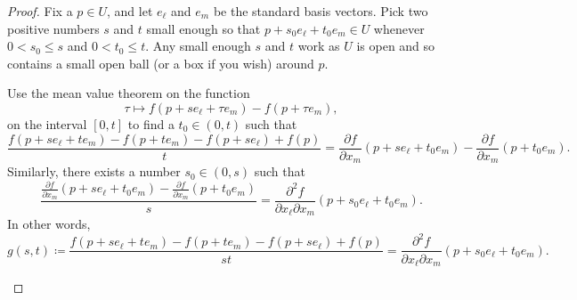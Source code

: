 \begin{proof}
Fix a $p \in U$, and let $e_{\ell}$ and $e_m$ be the standard basis vectors.
Pick two positive numbers $s$ and $t$ small enough so that
$p+s_0e_{\ell} +t_0e_m \in U$ whenever
$0 < s_0 \leq s$ and $0 < t_0 \leq t$.
Any small enough $s$ and $t$ work as $U$ is open and so
contains a small open ball (or a box if you wish) around $p$.

Use the mean value theorem on the function
\begin{equation*}
\tau \mapsto f(p+se_{\ell} + \tau e_m)-f(p + \tau e_m) ,
\end{equation*}
on the interval $[0,t]$
to find a $t_0 \in (0,t)$
such that
\begin{equation*}
\frac{f(p+se_{\ell} + te_m)- f(p+t e_m) - f(p+s e_{\ell})+f(p)}{t}
=
\frac{\partial f}{\partial x_m}(p + s e_{\ell} + t_0 e_m)
-
\frac{\partial f}{\partial x_m}(p + t_0 e_m) .
\end{equation*}
Similarly, there exists a number $s_0 \in (0,s)$ such that
\begin{equation*}
\frac{\frac{\partial f}{\partial x_m}(p + s e_{\ell} + t_0 e_m)
-
\frac{\partial f}{\partial x_m}(p + t_0 e_m)}{s}
=
\frac{\partial^2 f}{\partial x_{\ell} \partial x_m}(p + s_0 e_{\ell} + t_0 e_m) .
\end{equation*}
In other words,
\begin{equation*}
g(s,t)
\coloneqq
\frac{f(p+se_{\ell} + te_m)- f(p+t e_m) - f(p+s e_{\ell})+f(p)}{st}
=
\frac{\partial^2 f}{\partial x_{\ell} \partial x_m}(p + s_0 e_{\ell} + t_0 e_m) .
\end{equation*}

\begin{myfigureht}
\caption{Using the mean value theorem to estimate
a second order partial derivative by
a certain difference quotient.\label{fig:der2orderflip}}
\end{myfigureht}


\end{proof}
